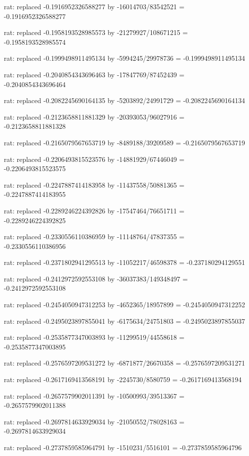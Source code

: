 \documentclass[a4paper,10pt]{article}
\begin{document}
\begin{eulernotebook}
\begin{eulercomment}
\begin{eulercomment}
\begin{eulercomment}
\begin{eulercomment}
\begin{eulercomment}
\begin{eulercomment}
\begin{eulercomment}
\begin{eulercomment}
\begin{eulercomment}
\begin{eulercomment}
\begin{eulercomment}
\begin{eulercomment}
\begin{eulercomment}
\begin{eulercomment}
\begin{eulercomment}
\begin{eulercomment}
\begin{euleroutput}
  rat: replaced -0.1916952326588277 by -16014703/83542521 = -0.1916952326588277
  
  rat: replaced -0.1958193528985573 by -21279927/108671215 = -0.1958193528985574
  
  rat: replaced -0.1999498911495134 by -5994245/29978736 = -0.1999498911495134
  
  rat: replaced -0.2040854343696463 by -17847769/87452439 = -0.2040854343696464
  
  rat: replaced -0.2082245690164135 by -5203892/24991729 = -0.2082245690164134
  
  rat: replaced -0.2123658811881329 by -20393053/96027916 = -0.2123658811881328
  
  rat: replaced -0.2165079567653719 by -8489188/39209589 = -0.2165079567653719
  
  rat: replaced -0.2206493815523576 by -14881929/67446049 = -0.2206493815523575
  
  rat: replaced -0.2247887414183958 by -11437558/50881365 = -0.2247887414183955
  
  rat: replaced -0.2289246224392826 by -17547464/76651711 = -0.2289246224392825
  
  rat: replaced -0.2330556110386959 by -11148764/47837355 = -0.2330556110386956
  
  rat: replaced -0.2371802941295513 by -11052217/46598378 = -0.237180294129551
  
  rat: replaced -0.2412972592553108 by -36037383/149348497 = -0.2412972592553108
  
  rat: replaced -0.2454050947312253 by -4652365/18957899 = -0.2454050947312252
  
  rat: replaced -0.2495023897855041 by -6175634/24751803 = -0.2495023897855037
  
  rat: replaced -0.2535877347003893 by -11299519/44558618 = -0.2535877347003895
  
  rat: replaced -0.2576597209531272 by -6871877/26670358 = -0.2576597209531271
  
  rat: replaced -0.2617169413568191 by -2245730/8580759 = -0.2617169413568194
  
  rat: replaced -0.2657579902011391 by -10500993/39513367 = -0.2657579902011388
  
  rat: replaced -0.2697814633929034 by -21050552/78028163 = -0.2697814633929034
  
  rat: replaced -0.2737859585964791 by -1510231/5516101 = -0.2737859585964796
  

\end{euleroutput}
\end{eulercomment}
\end{eulercomment}
\end{eulercomment}
\end{eulercomment}
\end{eulercomment}
\end{eulercomment}
\end{eulercomment}
\end{eulercomment}
\end{eulercomment}
\end{eulercomment}
\end{eulercomment}
\end{eulercomment}
\end{eulercomment}
\end{eulercomment}
\end{eulercomment}
\end{eulercomment}
\end{eulernotebook}
\end{document}
